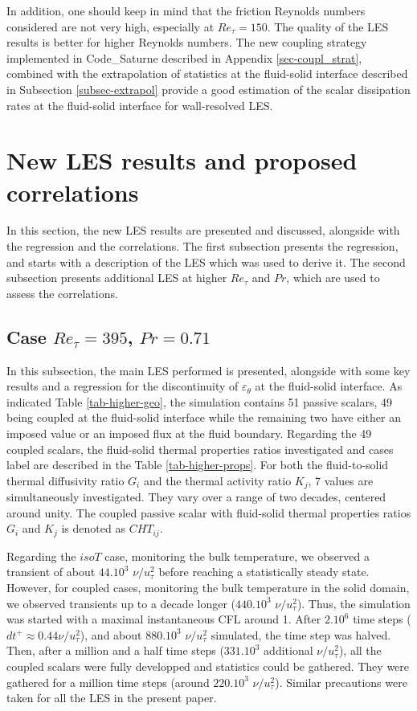 \documentclass{svjour3}                     %
\begin{document}
In addition, one should keep in mind that the friction Reynolds numbers considered are not very high, especially at $Re_\tau = 150$.
The quality of the LES results is better for higher Reynolds numbers.
The new coupling strategy implemented in {\selectfont Code\_Saturne} described in Appendix \ref{sec-coupl_strat}, combined with the extrapolation of statistics at the fluid-solid interface described in Subsection \ref{subsec-extrapol} provide a good estimation of the scalar dissipation rates at the fluid-solid interface for wall-resolved LES.

\section{New LES results and proposed correlations}
\label{sec-higher}

In this section, the new LES results are presented and discussed, alongside with the regression and the correlations.
The first subsection presents the regression, and starts with a description of the LES which was used to derive it.
The second subsection presents additional LES at higher $Re_\tau$ and $Pr$, which are used to assess the correlations.

\subsection{Case $Re_\tau = 395$, $Pr = 0.71$}
\label{subsec-les-395-071}

In this subsection, the main LES performed is presented, alongside with some key results and a regression for the discontinuity of $\varepsilon_\theta$ at the fluid-solid interface.
As indicated Table \ref{tab-higher-geo}, the simulation contains 51 passive scalars, 49 being coupled at the fluid-solid interface while the remaining two have either an imposed value or an imposed flux at the fluid boundary.
Regarding the 49 coupled scalars, the fluid-solid thermal properties ratios investigated and cases label are described in the Table \ref{tab-higher-props}.
For both the fluid-to-solid thermal diffusivity ratio $G_i$ and the thermal activity ratio $K_j$, 7 values are simultaneously investigated.
They vary over a range of two decades, centered around unity.
The coupled passive scalar with fluid-solid thermal properties ratios $G_i$ and $K_j$ is denoted as $CHT_{ij}$.

Regarding the $isoT$ case, monitoring the bulk temperature, we observed a transient of about $44.10^3$ $\nu / u_\tau^2$ before reaching a statistically steady state.
However, for coupled cases, monitoring the bulk temperature in the solid domain, we observed transients up to a decade longer ($440.10^3$ $\nu / u_\tau^2$).
Thus, the simulation was started with a maximal instantaneous CFL around 1.
After $2.10^6$ time steps ($dt^+ \approx 0.44 \nu / u_\tau^2$), and about $880.10^3$ $\nu / u_\tau^2$ simulated, the time step was halved.
Then, after a million and a half time steps ($331.10^3$ additional $\nu / u_\tau^2$), all the coupled scalars were fully developped and statistics could be gathered.
They were gathered for a million time steps (around $220.10^3$ $\nu / u_\tau^2$).
Similar precautions were taken for all the LES in the present paper.
\end{document}
